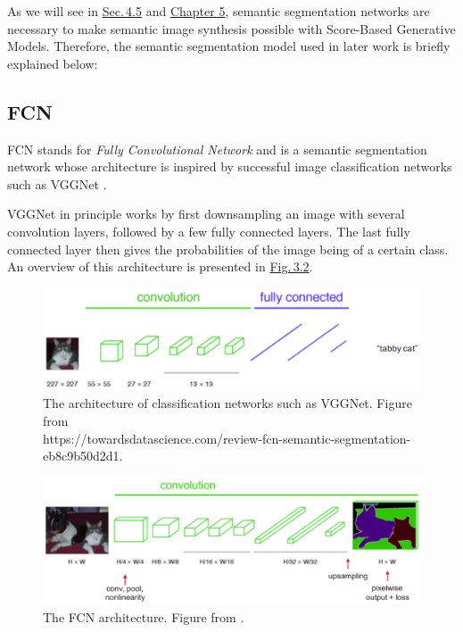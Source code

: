 As we will see in \hyperref[sec:4.5]{Sec.\,4.5} and \hyperref[chap:5]{Chapter 5}, semantic segmentation networks are necessary to make semantic image synthesis possible with Score-Based Generative Models. Therefore, the semantic segmentation model used in later work is briefly explained below:
%
\subsection{FCN} \label{sec:3.1.1}
FCN \cite{fcn} stands for \textit{Fully Convolutional Network} and is a semantic segmentation network whose architecture is inspired by successful image classification networks such as VGGNet \cite{vgg}. 

VGGNet in principle works by first downsampling an image with several convolution layers, followed by a few fully connected layers. The last fully connected layer then gives the probabilities of the image being of a certain class. An overview of this architecture is presented in \hyperref[fig:3.2]{Fig.\,3.2}.
%
\begin{figure} \label{fig:3.2}
    \centering
    \includegraphics[width=.65\textwidth]{Chapters/figures/vgg.PNG}
    \caption[The architecture of classification networks]{The architecture of classification networks such as VGGNet. Figure from\\ https://towardsdatascience.com/review-fcn-semantic-segmentation-eb8c9b50d2d1.}
\end{figure}
%
%
\begin{figure}[b] \label{fig:3.3}
    \centering
    \includegraphics[width=.65\textwidth]{Chapters/figures/fcn.PNG}
    \caption[The FCN architecture]{The FCN architecture. Figure from \cite{fcn}.}
\end{figure}
%

